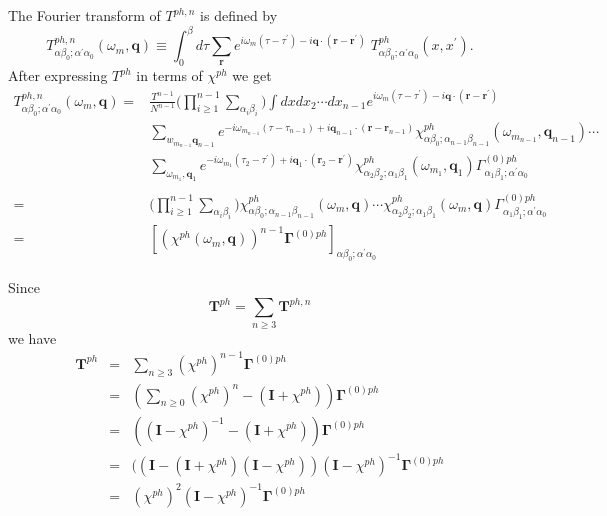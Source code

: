 The Fourier transform of $T^{ph,n}$ is defined by
\begin{equation}
T^{ph,n}_{\alpha \beta_0; \alpha^{\prime} \alpha_0}(\omega_m,\mathbf{q})
\equiv \int_0^{\beta} d\tau \sum_{\mathbf{r}}
e^{i \omega_m (\tau - \tau^{\prime})
- i\mathbf{q}\cdot(\mathbf{r}-\mathbf{r}^{\prime})}\;
T^{ph}_{\alpha \beta_0; \alpha^{\prime}\alpha_0}(x, x^{\prime}).
\end{equation}
After expressing $T^{ph}$ in terms of $\chi^{ph}$ we get
\begin{equation}
\begin{split}
T^{ph,n}_{\alpha \beta_0; \alpha^{\prime}\alpha_0}(\omega_m,\mathbf{q})
= & \frac{T^{n-1}}{N^{n-1}}
\big( \prod_{i \geq 1}^{n-1} \sum_{\alpha_i \beta_i} \big)
\int dx dx_2 \cdots dx_{n-1}
e^{i \omega_m (\tau - \tau^{\prime}) 
-i \mathbf{q} \cdot (\mathbf{r} - \mathbf{r}^{\prime})} \\
& \sum_{w_{m_{n-1}} \mathbf{q}_{n-1}}
e^{-i \omega_{m_{n-1}}(\tau - \tau_{n-1})
+i \mathbf{q}_{n-1} \cdot (\mathbf{r} - \mathbf{r}_{n-1})}
\chi^{ph}_{\alpha \beta_0; \alpha_{n-1} \beta_{n-1}}(\omega_{m_{n-1}},
\mathbf{q}_{n-1}) \cdots \\
& \sum_{\omega_{m_1},\mathbf{q}_1} 
e^{-i \omega_{m_1}(\tau_2 - \tau^{\prime})+
i \mathbf{q}_1 \cdot (\mathbf{r}_2 - \mathbf{r}^{\prime})}
\chi^{ph}_{\alpha_2 \beta_2; \alpha_1 \beta_1}(\omega_{m_1},\mathbf{q}_1)
\Gamma^{(0)ph}_{\alpha_1 \beta_1; \alpha^{\prime}\alpha_0}
\\ \\
= &  
\big( \prod_{i \geq 1}^{n-1} \sum_{\alpha_i \beta_i} \big)
\chi^{ph}_{\alpha \beta_0; \alpha_{n-1}\beta_{n-1}}(\omega_m, \mathbf{q})
\cdots \chi^{ph}_{\alpha_2 \beta_2; \alpha_1 \beta_1}
(\omega_m, \mathbf{q}) 
\Gamma^{(0)ph}_{\alpha_1 \beta_1; \alpha^{\prime}\alpha_0} \\
= &  \left[ \left(\chi^{ph}(\omega_m,\mathbf{q})\right)^{n-1}
\mathbf{\Gamma}^{(0)ph} \right]_{\alpha \beta_0; \alpha^{\prime}\alpha_0}
\end{split}
\end{equation}

Since
\begin{equation}
\mathbf{T}^{ph} = \sum_{n \geq 3} 
\mathbf{T}^{ph,n}
\end{equation}
we have
\begin{eqnarray}
\mathbf{T}^{ph} & = & \sum_{n \geq 3} (\chi^{ph})^{n-1}
\mathbf{\Gamma}^{(0)ph} \\
& = &  (\sum_{n \geq 0} 
(\chi^{ph})^{n} - (\mathbf{I} + \chi^{ph}))
\mathbf{\Gamma}^{(0)ph} \\
& = &  ( (\mathbf{I} - \chi^{ph})^{-1} - (\mathbf{I}
+ \chi^{ph})) \mathbf{\Gamma}^{(0)ph} \\
& = &  ( (\mathbf{I} - (\mathbf{I}+\chi^{ph})
(\mathbf{I} - \chi^{ph}))(\mathbf{I} - \chi^{ph})^{-1}
\mathbf{\Gamma}^{(0)ph} \\
& = &  (\chi^{ph})^2 (\mathbf{I} - \chi^{ph})^{-1}
\mathbf{\Gamma}^{(0)ph}
\end{eqnarray}


